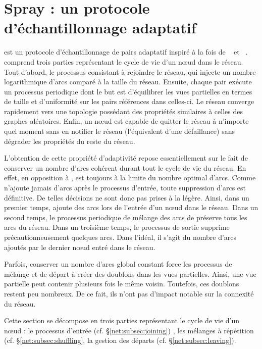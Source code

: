 
\section{Spray : un protocole d'échantillonnage adaptatif}
\label{net:sec:spray}

\SPRAY est un protocole d'échantillonnage de pairs adaptatif inspiré à
la fois de \SCAMP~\cite{ganesh2003peer} et
\CYCLON~\cite{voulgaris2005cyclon}. \SPRAY comprend trois parties représentant
le cycle de vie d'un nœud dans le réseau. Tout d'abord, le processus consistant
à rejoindre le réseau, qui injecte un nombre logarithmique d'arcs comparé à la
taille du réseau.  Ensuite, chaque pair exécute un processus periodique dont le
but est d'équilibrer les vues partielles en termes de taille et d'uniformité sur
les pairs références dans celles-ci. Le réseau converge rapidement vers une
topologie possédant des propriétés similaires à celles des graphes
aléatoires. Enfin, un nœud est capable de quitter le réseau à n'importe quel
moment sans en notifier le réseau (l'équivalent d'une défaillance) sans dégrader
les propriétés du reste du réseau.

L'obtention de cette propriété d'adaptivité repose essentiellement sur le fait
de conserver un nombre d'arcs cohérent durant tout le cycle de vie du réseau.
En effet, en opposition à \CYCLON, \SPRAY est toujours à la limite du nombre
optimal d'arcs. Comme \SPRAY n'ajoute jamais d'arcs après le processus d'entrée,
toute suppression d'arcs est définitive. De telles décisions ne sont donc pas
prises à la légère. Ainsi, dans un premier temps, \SPRAY ajoute des arcs lors de
l'entrée d'un nœud dans le réseau. Dans un second temps, le processus periodique
de mélange des arcs de \SPRAY préserve tous les arcs du réseau.  Dans un
troisième temps, le processus de sortie supprime précautionneusement quelques
arcs. Dans l'idéal, il s'agit du nombre d'arcs ajoutés par le dernier nœud entré
dans le réseau.

Parfois, conserver un nombre d'arcs global constant force les processus de
mélange et de départ à créer des doublons dans les vues partielles. Ainsi, une
vue partielle peut contenir plusieurs fois le même voisin. Toutefois, ces
doublons restent peu nombreux. De ce fait, ils n'ont pas d'impact notable sur la
connexité du réseau.

Cette section se décompose en trois parties représentant le cycle de vie d'un
nœud : le processus d'entrée (cf. §\ref{net:subsec:joining}) , les mélanges à
répétition (cf. §\ref{net:subsec:shuffling}, la gestion des départs
(cf. §\ref{net:subsec:leaving}).


